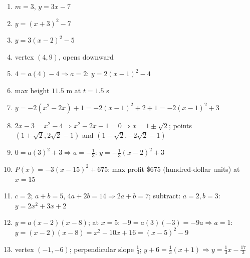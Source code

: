 \documentclass[11pt]{article}
\begin{document}
\begin{keybox}
\begin{multicols}{2}
\small
\begin{enumerate}[leftmargin=*,itemsep=3pt]
  \item $m=3$, $y=3x-7$
  \item $y=(x+3)^2-7$
  \item $y=3(x-2)^2-5$
  \item vertex $(4,9)$, opens downward
  \item $4=a(4)-4\Rightarrow a=2$: $y=2(x-1)^2-4$
  \item max height $11.5$ m at $t=1.5$ s
  \item $y=-2(x^2-2x)+1=-2(x-1)^2+2+1=-2(x-1)^2+3$
  \item $2x-3=x^2-4\Rightarrow x^2-2x-1=0\Rightarrow x=1\pm\sqrt2$; points $(1+\sqrt2,2\sqrt2-1)$ and $(1-\sqrt2,-2\sqrt2-1)$
  \item $0=a(3)^2+3\Rightarrow a=-\tfrac13$: $y=-\tfrac13(x-2)^2+3$
  \item $P(x)=-3(x-15)^2+675$: max profit \$675 (hundred-dollar units) at $x=15$
  \item $c=2$; $a+b=5$, $4a+2b=14\Rightarrow2a+b=7$; subtract: $a=2,b=3$: $y=2x^2+3x+2$
  \item $y=a(x-2)(x-8)$; at $x=5$: $-9=a(3)(-3)=-9a\Rightarrow a=1$: $y=(x-2)(x-8)=x^2-10x+16=(x-5)^2-9$
  \item vertex $(-1,-6)$; perpendicular slope $\tfrac13$; $y+6=\tfrac13(x+1)\Rightarrow y=\tfrac13x-\tfrac{17}3$
\end{enumerate}
\end{multicols}
\end{keybox}
\end{document}
